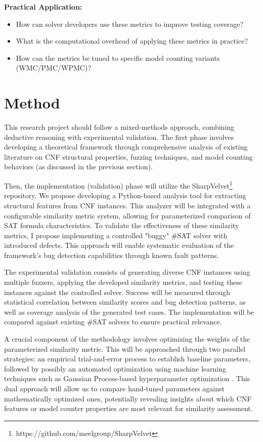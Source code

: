 \documentclass[english, a4paper]{article}
\begin{document}
\textbf{Practical Application:}
\begin{itemize}
    \item How can solver developers use these metrics to improve testing coverage?
    \item What is the computational overhead of applying these metrics in practice?
    \item How can the metrics be tuned to specific model counting variants (WMC/PMC/WPMC)?
\end{itemize}

\section*{Method}

This research project should follow a mixed-methods approach, combining deductive reasoning with experimental validation. The first phase involves developing a theoretical framework through comprehensive analysis of existing literature on CNF structural properties, fuzzing techniques, and model counting behaviors (as discussed in the previous section).

Then, the implementation (validation) phase will utilize the SharpVelvet\footnote{https://github.com/meelgroup/SharpVelvet} repository. We propose developing a Python-based analysis tool for extracting structural features from CNF instances. This analyzer will be integrated with a configurable similarity metric system, allowing for parameterized comparison of SAT formula characteristics. To validate the effectiveness of these similarity metrics, I propose implementing a controlled "buggy" \#SAT solver with introduced defects. This approach will enable systematic evaluation of the framework's bug detection capabilities through known fault patterns.

The experimental validation consists of generating diverse CNF instances using multiple fuzzers, applying the developed similarity metrics, and testing these instances against the controlled solver. Success will be measured through statistical correlation between similarity scores and bug detection patterns, as well as coverage analysis of the generated test cases. The implementation will be compared against existing \#SAT solvers \parencite{dudekDPMCWeightedModel2020,dudekADDMCWeightedModel2020} to ensure practical relevance.

A crucial component of the methodology involves optimizing the weights of the parameterized similarity metric. This will be approached through two parallel strategies: an empirical trial-and-error process to establish baseline parameters, followed by possibly an automated optimization using machine learning techniques such as Gaussian Process-based hyperparameter optimization \parencite{shahriariTakingHumanOut2016}. This dual approach will allow us to compare hand-tuned parameters against mathematically optimized ones, potentially revealing insights about which CNF features or model counter properties are most relevant for similarity assessment.
\end{document}
